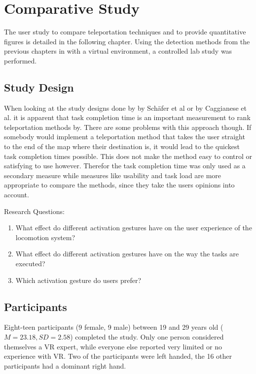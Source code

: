 \chapter{Comparative Study}
The user study to compare teleportation techniques and to provide quantitative figures is detailed in the following chapter. Using the detection methods from the previous chapters in with a virtual environment, a controlled lab study was performed. 




\section{Study Design}
When looking at the study designs done by by Schäfer et al \cite{Schafer2021} or by Caggianese et al. \cite{Caggianese} it is apparent that task completion time is an important measurement to rank teleportation methods by. There are some problems with this approach though. If somebody would implement a teleportation method that takes the user straight to the end of the map where their destination is, it would lead to the quickest task completion times possible. This does not make the method easy to control or satisfying to use however. Therefor the task completion time was only used as a secondary measure while measures like usability and task load are more appropriate to compare the methods, since they take the users opinions into account. 



Research Questions:
\begin{enumerate}
    \item What effect do different activation gestures have on the user experience of the locomotion system?
    \item What effect do different activation gestures have on the way the tasks are executed?
    \item Which activation gesture do users prefer?
\end{enumerate}

\section{Participants}
Eight-teen participants (9 female, 9 male) between 19 and 29 years old ($M=23.18,SD=2.58$) completed the study. Only one person considered themselves a VR expert, while everyone else reported very limited or no experience with VR. Two of the participants were left handed, the 16 other participants had a dominant right hand. 

